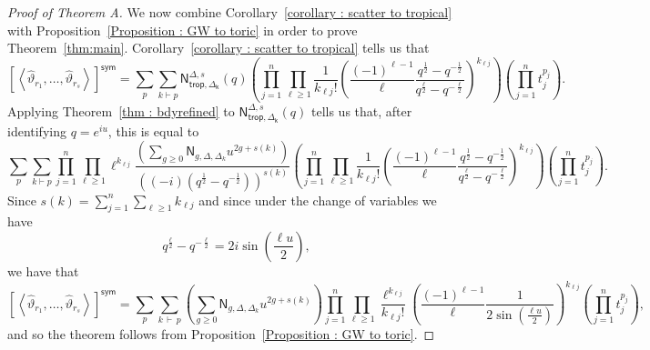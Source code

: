 \documentclass[11pt]{amsart}
\numberwithin{equation}{section}
\theoremstyle{plain}
\theoremstyle{remark}
\theoremstyle{definition}
\begin{document}
\begin{proof}[Proof of Theorem A]
  We now combine Corollary~\ref{corollary : scatter to tropical} with Proposition~\ref{Proposition : GW to toric} in order to prove Theorem~\ref{thm:main}. Corollary~\ref{corollary : scatter to tropical} tells us that
  $$ \left[\left\langle\hat{\vartheta}_{r_1},\ldots,\hat{\vartheta}_{r_s}\right\rangle\right]^\mathsf{sym}
    = \sum_p \sum_{k \vdash p} \mathsf{N}^{\Delta,s}_{\mathsf{trop, \Delta_{k}}}(q)\left( \prod_{j=1}^n \prod_{\ell \geq 1} \frac{1}{k_{\ell j}!} \left(\frac{(-1)^{\ell -1}}{\ell} \frac{q^{\frac{1}{2}} - q^{-\frac{1}{2}}}{q^{\frac{\ell}{2}} - q^{-\frac{\ell}{2}}}\right)^{k_{\ell j}}\right)\left(\prod_{j=1}^n t_j^{p_j}\right).$$
    Applying Theorem~\ref{thm : bdyrefined} to $\mathsf{N}^{\Delta,s}_{\mathsf{trop, \Delta_{k}}}(q)$ tells us that, after identifying $q=e^{iu}$, this is equal to
    $$\sum_p \sum_{k \vdash p} \prod_{j=1}^n \prod_{\ell \geq 1} \ell^{k_{\ell j}}\frac{\left(\sum_{g \geq 0} \mathsf{N}_{g,\Delta, \Delta_k}u^{2g + s(k)} \right)}{\left((-i)\left(q^{\frac{1}{2}} - q^{-\frac{1}{2}}\right)\right)^{s(k)}} \left( \prod_{j=1}^n \prod_{\ell \geq 1} \frac{1}{k_{\ell j}!} \left(\frac{(-1)^{\ell -1}}{\ell} \frac{q^{\frac{1}{2}} - q^{-\frac{1}{2}}}{q^{\frac{\ell}{2}} - q^{-\frac{\ell}{2}}}\right)^{k_{\ell j}}\right)\left(\prod_{j=1}^n t_j^{p_j}\right).$$ Since $s(k) = \sum_{j=1}^n \sum_{\ell \geq 1} k_{\ell j}$ and since under the change of variables we have
    $$q^{\frac{\ell }{2}} - q^{-\frac{\ell }{2}} = 2 i \sin\left(\frac{\ell u}{2}\right),$$
    we have that
    $$ \left[\left\langle\hat{\vartheta}_{r_1},\ldots,\hat{\vartheta}_{r_s}\right\rangle\right]^\mathsf{sym} =  \sum_{p} \sum_{k \, \vdash \, p} \left(\sum_{g \geq 0} \mathsf{N}_{g,\Delta, \Delta_k}u^{2g + s(k)} \right)\prod_{j=1}^n \prod_{\ell \geq 1} \frac{\ell^{k_{\ell j}}}{k_{\ell j}!} \left(\frac{(-1)^{\ell - 1}}{\ell} \frac{1}{2 \sin\left(\frac{\ell u}{2}\right)}\right)^{k_{\ell j}}\left(\prod_{j=1}^n t_j^{p_j}\right),$$ and so the theorem follows from Proposition~\ref{Proposition : GW to toric}.
    
\end{proof}

\end{document}
